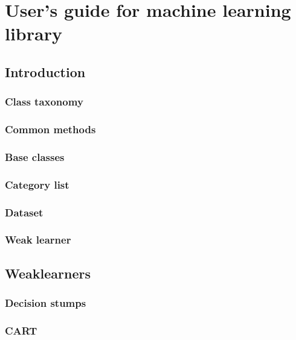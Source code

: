 
\chapter{User's guide for machine learning library}

\section{Introduction}

\subsection{Class taxonomy}

\subsection{Common methods}

\subsection{Base classes}

\subsection{Category list}

\subsection{Dataset}

\subsection{Weak learner}

\section{Weaklearners}

\subsection{Decision stumps}

\subsection{CART}

